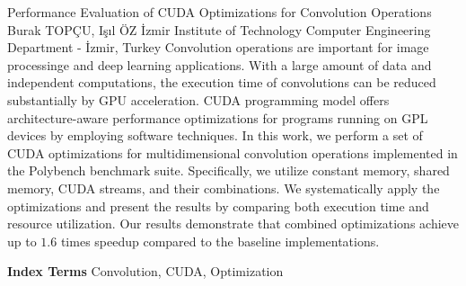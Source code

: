 
    \begin{abstract_online}{Performance Evaluation of CUDA Optimizations for Convolution Operations}{%
        Burak TOPÇU, Işıl ÖZ}{%
        }{%
        İzmir Institute of Technology Computer Engineering Department - İzmir, Turkey}
    Convolution operations are important for image processinge and deep learning applications. With a large amount of data and independent computations, the execution time of convolutions can be reduced substantially by GPU acceleration. CUDA programming model offers architecture-aware performance optimizations for programs running on GPL devices by employing software techniques. In this work, we perform a set of CUDA optimizations for multidimensional convolution operations implemented in the Polybench benchmark suite. Specifically, we utilize constant memory, shared memory, CUDA streams, and their combinations. We systematically apply the optimizations and present the results by comparing both execution time and resource utilization. Our results demonstrate that combined optimizations achieve up to $1.6$ times speedup compared to the baseline implementations. 
    
            \textbf{Index Terms} \newline{}Convolution, CUDA, Optimization
    \end{abstract_online}
    